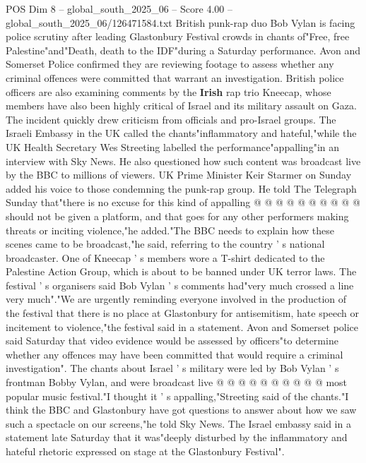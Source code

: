 \begin{textsample}{POS Dim 8 – global\_south\_2025\_06 – Score 4.00 – global\_south\_2025\_06/126471584.txt}  \label{ex:f8_pos_194}
British punk-rap duo Bob Vylan is facing police scrutiny after leading Glastonbury Festival crowds in chants of"Free, free Palestine"and"Death, death to the IDF"during a Saturday performance.
Avon and Somerset Police confirmed they are reviewing footage to assess whether any criminal offences were committed that warrant an investigation.
British police officers are also examining comments by the \textbf{Irish} rap trio Kneecap, whose members have also been highly critical of Israel and its military assault on Gaza.
The incident quickly drew criticism from officials and pro-Israel groups.
The Israeli Embassy in the UK called the chants"inflammatory and hateful,"while the UK Health Secretary Wes Streeting labelled the performance"appalling"in an interview with Sky News.
He also questioned how such content was broadcast live by the BBC to millions of viewers.
UK Prime Minister Keir Starmer on Sunday added his voice to those condemning the punk-rap group.
He told The Telegraph Sunday that"there is no excuse for this kind of appalling @ @ @ @ @ @ @ @ @ @ should not be given a platform, and that goes for any other performers making threats or inciting violence,"he added."The BBC needs to explain how these scenes came to be broadcast,"he said, referring to the country ' s national broadcaster.
One of Kneecap ' s members wore a T-shirt dedicated to the Palestine Action Group, which is about to be banned under UK terror laws.
The festival ' s organisers said Bob Vylan ' s comments had"very much crossed a line very much"."We are urgently reminding everyone involved in the production of the festival that there is no place at Glastonbury for antisemitism, hate speech or incitement to violence,"the festival said in a statement.
Avon and Somerset police said Saturday that video evidence would be assessed by officers"to determine whether any offences may have been committed that would require a criminal investigation".
The chants about Israel ' s military were led by Bob Vylan ' s frontman Bobby Vylan, and were broadcast live @ @ @ @ @ @ @ @ @ @ most popular music festival."I thought it ' s appalling,"Streeting said of the chants."I think the BBC and Glastonbury have got questions to answer about how we saw such a spectacle on our screens,"he told Sky News.
The Israel embassy said in a statement late Saturday that it was"deeply disturbed by the inflammatory and hateful rhetoric expressed on stage at the Glastonbury Festival".

\end{textsample}
